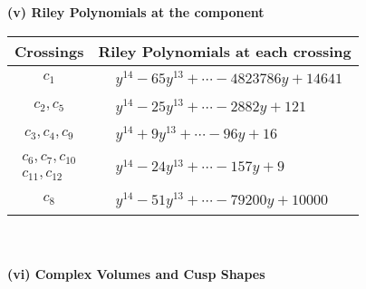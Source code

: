 \documentclass[1p]{elsarticle_modified}
\theoremstyle{definition}
\begin{document}
\newpage\renewcommand{\arraystretch}{1}
\flushleft \textbf{(v) Riley Polynomials at the component}\newline \\
\begin{tabular}{m{50pt}|m{274pt}}
Crossings & \hspace{64pt}Riley Polynomials at each crossing \\
\hline $$\begin{aligned}c_{1}\end{aligned}$$&$\begin{aligned}
&y^{14}-65 y^{13}+\cdots-4823786 y+14641
\end{aligned}$\\
\hline $$\begin{aligned}c_{2},c_{5}\end{aligned}$$&$\begin{aligned}
&y^{14}-25 y^{13}+\cdots-2882 y+121
\end{aligned}$\\
\hline $$\begin{aligned}c_{3},c_{4},c_{9}\end{aligned}$$&$\begin{aligned}
&y^{14}+9 y^{13}+\cdots-96 y+16
\end{aligned}$\\
\hline $$\begin{aligned}c_{6},c_{7},c_{10}\\c_{11},c_{12}\end{aligned}$$&$\begin{aligned}
&y^{14}-24 y^{13}+\cdots-157 y+9
\end{aligned}$\\
\hline $$\begin{aligned}c_{8}\end{aligned}$$&$\begin{aligned}
&y^{14}-51 y^{13}+\cdots-79200 y+10000
\end{aligned}$\\
\hline
\end{tabular}\\~\\
\newpage\flushleft \textbf{(vi) Complex Volumes and Cusp Shapes}
\end{document}
